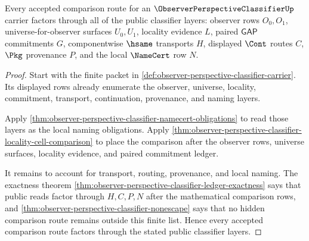 \begin{theorem}
\label{thm:observer-perspective-classifier-comparison-route-totality}
Every accepted comparison route for an $\ObserverPerspectiveClassifierUp$ carrier factors through all of the public classifier layers: observer rows $O_0,O_1$, universe-for-observer surfaces $U_0,U_1$, locality evidence $L$, paired $\mathsf{GAP}$ commitments $G$, componentwise $\hsame$ transports $H$, displayed $\Cont$ routes $C$, $\Pkg$ provenance $P$, and the local $\NameCert$ row $N$.
\end{theorem}
\begin{proof}
Start with the finite packet in \autoref{def:observer-perspective-classifier-carrier}. Its displayed rows already enumerate the observer, universe, locality, commitment, transport, continuation, provenance, and naming layers.

Apply \autoref{thm:observer-perspective-classifier-namecert-obligations} to read those layers as the local naming obligations. Apply \autoref{thm:observer-perspective-classifier-locality-cell-comparison} to place the comparison after the observer rows, universe surfaces, locality evidence, and paired commitment ledger.

It remains to account for transport, routing, provenance, and local naming. The exactness theorem \autoref{thm:observer-perspective-classifier-ledger-exactness} says that public reads factor through $H,C,P,N$ after the mathematical comparison rows, and \autoref{thm:observer-perspective-classifier-nonescape} says that no hidden comparison route remains outside this finite list. Hence every accepted comparison route factors through the stated public classifier layers.
\end{proof}

